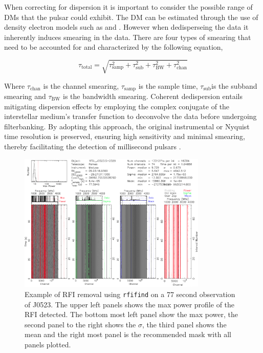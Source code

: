 When correcting for dispersion it is important to consider the possible range of DMs that the pulsar could exhibit. The DM can be estimated through the use of density electron models such as \cite{cordes_ne2001i_2003} and \cite{yao_new_2017}. However when dedisperseing the data it inherently induces smearing in the data. There are four types of smearing that need to be accounted for and characterized by the following equation, 

\begin{equation}
    \tau_{\text{total}} = \sqrt{\tau_{\text{samp}}^2 + \tau_{\text{sub}}^2 + \tau_{\text{BW}}^2 + \tau_{\text{chan}}^2}
\end{equation}

Where $\tau_\text{chan}$ is the channel smearing, $\tau_\text{samp}$ is the sample time, $\tau_\text{sub}$is the subband smearing and $\tau_\text{BW}$ is the bandwidth smearing. Coherent dedispersion entails mitigating dispersion effects by employing the complex conjugate of the interstellar medium's transfer function to deconvolve the data before undergoing filterbanking. By adopting this approach, the original instrumental or Nyquist time resolution is preserved, ensuring high sensitivity and minimal smearing, thereby facilitating the detection of millisecond pulsars \citep{hankins_pulsar_1975}. 



\begin{figure}
    \centering
    \includegraphics[width = 0.8\textwidth]{figs/rfifindexample.png}
    \caption{Example of RFI removal using \texttt{rfifind} on a 77 second observation of J0523. The upper left panels shows the max power profile of the RFI detected. The bottom most left panel show the max power, the second panel to the right shows the $\sigma$, the third panel shows the mean and the right most panel is the recommended mask with all panels plotted.}
    \label{fig: rfifindexample}
\end{figure}

